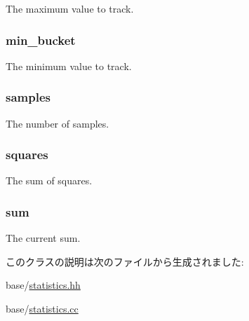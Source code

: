 \label{classStats_1_1HistStor_aed6ecbe61a17b3a0ef319655805a77d9}
The maximum value to track. \hypertarget{classStats_1_1HistStor_a9d864ebe1be0714ea4599a5d4e52404d}{
\subsubsection[{min\_\-bucket}]{ {\bf min\_\-bucket}}}
\label{classStats_1_1HistStor_a9d864ebe1be0714ea4599a5d4e52404d}
The minimum value to track. \hypertarget{classStats_1_1HistStor_ab4db99aba3dd28686061dd3d5475b3bd}{
\subsubsection[{samples}]{ {\bf samples}}}
\label{classStats_1_1HistStor_ab4db99aba3dd28686061dd3d5475b3bd}
The number of samples. \hypertarget{classStats_1_1HistStor_a0c02ec1e072d692448ce4429a78e3675}{
\subsubsection[{squares}]{ {\bf squares}}}
\label{classStats_1_1HistStor_a0c02ec1e072d692448ce4429a78e3675}
The sum of squares. \hypertarget{classStats_1_1HistStor_ab5b201cce7e10c48f62b71605e75707e}{
\subsubsection[{sum}]{ {\bf sum}}}
\label{classStats_1_1HistStor_ab5b201cce7e10c48f62b71605e75707e}
The current sum. 

このクラスの説明は次のファイルから生成されました:\begin{DoxyCompactItemize}
\item 
base/\hyperlink{statistics_8hh}{statistics.hh}\item 
base/\hyperlink{statistics_8cc}{statistics.cc}\end{DoxyCompactItemize}
